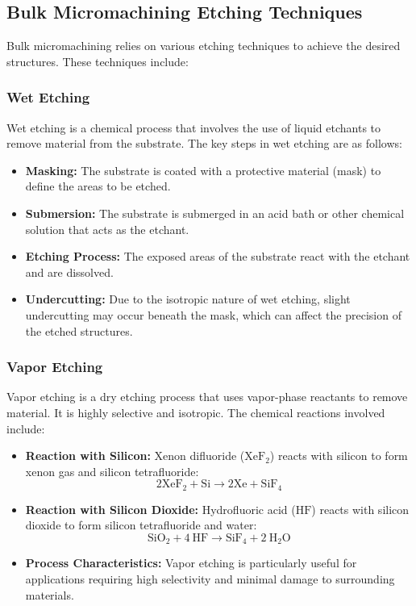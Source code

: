 \documentclass{report}
\begin{document}
\subsection{Bulk Micromachining Etching Techniques}
Bulk micromachining relies on various etching techniques to achieve the desired structures. These techniques include:

\subsubsection{Wet Etching}
Wet etching is a chemical process that involves the use of liquid etchants to remove material from the substrate. The key steps in wet etching are as follows:
\begin{itemize}
    \item \textbf{Masking:} The substrate is coated with a protective material (mask) to define the areas to be etched.
    \item \textbf{Submersion:} The substrate is submerged in an acid bath or other chemical solution that acts as the etchant.
    \item \textbf{Etching Process:} The exposed areas of the substrate react with the etchant and are dissolved.
    \item \textbf{Undercutting:} Due to the isotropic nature of wet etching, slight undercutting may occur beneath the mask, which can affect the precision of the etched structures.
\end{itemize}

\subsubsection{Vapor Etching}
Vapor etching is a dry etching process that uses vapor-phase reactants to remove material. It is highly selective and isotropic. The chemical reactions involved include:
\begin{itemize}
    \item \textbf{Reaction with Silicon:} Xenon difluoride ($\text{XeF}_{2}$) reacts with silicon to form xenon gas and silicon tetrafluoride:
    \[
        2\text{XeF}_{2} + \text{Si} \rightarrow 2\text{Xe} + \text{SiF}_{4}
    \]
    \item \textbf{Reaction with Silicon Dioxide:} Hydrofluoric acid ($\text{HF}$) reacts with silicon dioxide to form silicon tetrafluoride and water:
    \[
        \text{SiO}_{2} + 4~\text{HF} \rightarrow \text{SiF}_{4} + 2~\text{H}_{2}\text{O}
    \]
    \item \textbf{Process Characteristics:} Vapor etching is particularly useful for applications requiring high selectivity and minimal damage to surrounding materials.
\end{itemize}
\end{document}
